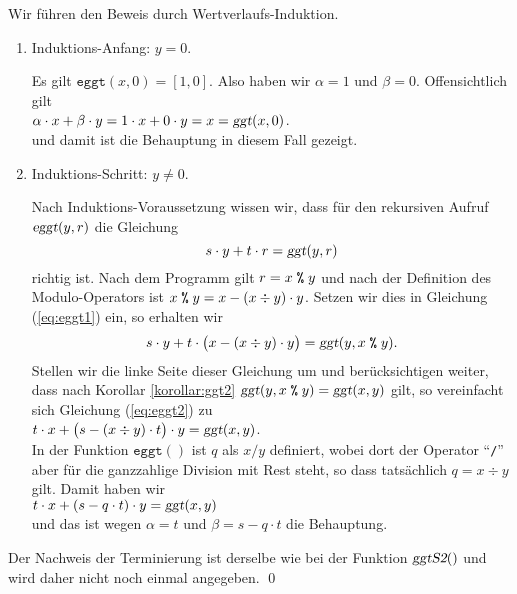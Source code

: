\proof
Wir führen den Beweis durch Wertverlaufs-Induktion.
\begin{enumerate}
\item Induktions-Anfang: $y = 0$.

      Es gilt $\mathtt{eggt}(x, 0) = [ 1, 0 ]$.  Also haben wir $\alpha = 1$ und $\beta = 0$. 
      Offensichtlich gilt 
      \\[0.2cm]
      \hspace*{1.3cm}
      $\alpha \cdot x + \beta \cdot y = 1 \cdot x + 0 \cdot y = x = \textsl{ggt}(x, 0)$.
      \\[0.2cm]
      und damit ist die Behauptung in diesem Fall gezeigt. 
\item Induktions-Schritt: $y \not= 0$.

      Nach Induktions-Voraussetzung wissen wir, dass für den rekursiven Aufruf $\textsl{eggt}(y, r)$
      die Gleichung
      \begin{equation}
        \label{eq:eggt1}
        s \cdot y + t \cdot r = \textsl{ggt}(y, r)
      \end{equation}
      richtig ist.  Nach dem Programm gilt $r = x \;\texttt{\%}\; y$ und nach der Definition
      des Modulo-Operators ist $x \;\texttt{\%}\; y = x - (x \div y) \cdot y$.
      Setzen wir dies in Gleichung (\ref{eq:eggt1}) ein, so erhalten wir
      \begin{equation}
        \label{eq:eggt2}
        s \cdot y + t \cdot \bigl(x - (x \div y) \cdot y\bigr) = \textsl{ggt}(y, x \;\texttt{\%}\; y).        
      \end{equation}
      Stellen wir die linke Seite dieser Gleichung um und berücksichtigen weiter, dass nach 
      Korollar \ref{korollar:ggt2} $\textsl{ggt}(y, x \;\texttt{\%}\; y) = \textsl{ggt}(x, y)$ gilt,
      so vereinfacht sich Gleichung (\ref{eq:eggt2}) zu
      \\[0.2cm]
      \hspace*{1.3cm}
      $t \cdot x + \bigl(s - (x \div y)\cdot t\bigr) \cdot y = \textsl{ggt}(x, y)$.        
      \\[0.2cm]
      In der Funktion $\mathtt{eggt}()$ ist $q$ als $x / y$ definiert, wobei dort der Operator
      ``\texttt{/}''  aber
      für die ganzzahlige Division mit Rest steht, so dass tatsächlich $q = x \div y$ gilt.  Damit
      haben wir 
      \\[0.2cm]
      \hspace*{1.3cm}
      $t \cdot x + (s - q \cdot t) \cdot y = \textsl{ggt}(x, y)$
      \\[0.2cm]
      und das ist wegen $\alpha = t$ und $\beta = s - q \cdot t$ die Behauptung. 
\end{enumerate}
Der Nachweis der Terminierung ist derselbe wie bei der Funktion $\textsl{ggtS2}()$ und
wird daher nicht noch einmal angegeben. \qed


